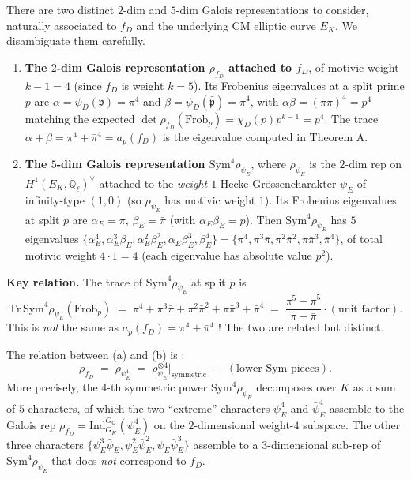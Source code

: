 \documentclass[
  11pt,
  a4paper,
]{amsart}
\begin{document}
There are two distinct \(2\)-dim and \(5\)-dim Galois representations to consider, naturally associated to \(f_D\) and the underlying CM elliptic curve \(E_K\). We disambiguate them carefully.

\begin{enumerate}
\def\labelenumi{(\alph{enumi})}
\item
  \textbf{The \(2\)-dim Galois representation \(\rho_{f_D}\) attached to \(f_D\)}, of motivic weight \(k - 1 = 4\) (since \(f_D\) is weight \(k = 5\)). Its Frobenius eigenvalues at a split prime \(p\) are \(\alpha = \psi_D(\mathfrak{p}) = \pi^4\) and \(\beta = \psi_D(\bar{\mathfrak{p}}) = \bar\pi^4\), with \(\alpha\beta = (\pi\bar\pi)^4 = p^4\) matching the expected \(\det \rho_{f_D}(\mathrm{Frob}_p) = \chi_D(p) p^{k - 1} = p^4\). The trace \(\alpha + \beta = \pi^4 + \bar\pi^4 = a_p(f_D)\) is the eigenvalue computed in Theorem A.
\item
  \textbf{The \(5\)-dim Galois representation \(\mathrm{Sym}^4 \rho_{\psi_E}\)}, where \(\rho_{\psi_E}\) is the \(2\)-dim rep on \(H^1(E_K, \mathbb{Q}_\ell)^\vee\) attached to the \emph{weight-\(1\)} Hecke Grössencharakter \(\psi_E\) of infinity-type \((1, 0)\) (so \(\rho_{\psi_E}\) has motivic weight \(1\)). Its Frobenius eigenvalues at split \(p\) are \(\alpha_E = \pi\), \(\beta_E = \bar\pi\) (with \(\alpha_E\beta_E = p\)). Then \(\mathrm{Sym}^4 \rho_{\psi_E}\) has \(5\) eigenvalues \(\{\alpha_E^4, \alpha_E^3\beta_E, \alpha_E^2\beta_E^2, \alpha_E\beta_E^3, \beta_E^4\} = \{\pi^4, \pi^3\bar\pi, \pi^2\bar\pi^2, \pi\bar\pi^3, \bar\pi^4\}\), of total motivic weight \(4 \cdot 1 = 4\) (each eigenvalue has absolute value \(p^2\)).
\end{enumerate}

\textbf{Key relation.} The trace of \(\mathrm{Sym}^4 \rho_{\psi_E}\) at split \(p\) is
\[
\mathrm{Tr}\,\mathrm{Sym}^4 \rho_{\psi_E}(\mathrm{Frob}_p) \;=\; \pi^4 + \pi^3\bar\pi + \pi^2\bar\pi^2 + \pi\bar\pi^3 + \bar\pi^4 \;=\; \frac{\pi^5 - \bar\pi^5}{\pi - \bar\pi} \cdot (\text{unit factor}).
\]
This is \emph{not} the same as \(a_p(f_D) = \pi^4 + \bar\pi^4\) ! The two are related but distinct.

The relation between (a) and (b) is :
\[
\rho_{f_D} \;=\; \rho_{\psi_E^4} \;=\; \rho_{\psi_E}^{\otimes 4}\bigr|_{\text{symmetric}} \;-\; (\text{lower Sym pieces}).
\]
More precisely, the \(4\)-th symmetric power \(\mathrm{Sym}^4 \rho_{\psi_E}\) decomposes over \(K\) as a sum of \(5\) characters, of which the two ``extreme'' characters \(\psi_E^4\) and \(\bar\psi_E^4\) assemble to the Galois rep \(\rho_{f_D} = \mathrm{Ind}_{G_K}^{G_\mathbb{Q}}(\psi_E^4)\) on the \(2\)-dimensional weight-\(4\) subspace. The other three characters \(\{\psi_E^3 \bar\psi_E, \psi_E^2 \bar\psi_E^2, \psi_E \bar\psi_E^3\}\) assemble to a \(3\)-dimensional sub-rep of \(\mathrm{Sym}^4 \rho_{\psi_E}\) that does \emph{not} correspond to \(f_D\).
\end{document}
